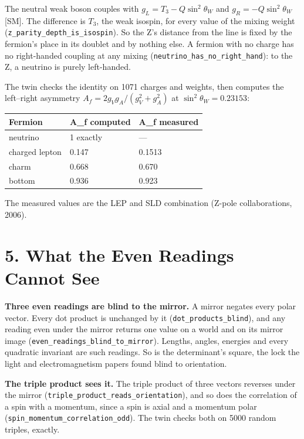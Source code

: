 \documentclass[10pt]{article}
\begin{document}
The neutral weak boson couples with \(g_L=T_3-Q\sin^2\theta_W\) and
\(g_R=-Q\sin^2\theta_W\) {[}SM{]}. The difference is \(T_3\), the weak
isospin, for every value of the mixing weight
(\texttt{z\_parity\_depth\_is\_isospin}). So the Z's distance from the
line is fixed by the fermion's place in its doublet and by nothing else.
A fermion with no charge has no right-handed coupling at any mixing
(\texttt{neutrino\_has\_no\_right\_hand}): to the Z, a neutrino is
purely left-handed.

The twin checks the identity on 1071 charges and weights, then computes
the left--right asymmetry \(A_f=2g_Vg_A/(g_V^2+g_A^2)\) at
\(\sin^2\theta_W=0.23153\):

\begin{longtable}[]{@{}lll@{}}
\toprule\noalign{}
Fermion & A\_f computed & A\_f measured \\
\midrule\noalign{}
\endhead
\bottomrule\noalign{}
\endlastfoot
neutrino & 1 exactly & --- \\
charged lepton & 0.147 & 0.1513 \\
charm & 0.668 & 0.670 \\
bottom & 0.936 & 0.923 \\
\end{longtable}

The measured values are the LEP and SLD combination (Z-pole
collaborations, 2006).

\hypertarget{what-the-even-readings-cannot-see}{%
\section{5. What the Even Readings Cannot
See}\label{what-the-even-readings-cannot-see}}

\textbf{Three even readings are blind to the mirror.} A mirror negates
every polar vector. Every dot product is unchanged by it
(\texttt{dot\_products\_blind}), and any reading even under the mirror
returns one value on a world and on its mirror image
(\texttt{even\_readings\_blind\_to\_mirror}). Lengths, angles, energies
and every quadratic invariant are such readings. So is the determinant's
square, the lock the light and electromagnetism papers found blind to
orientation.

\textbf{The triple product sees it.} The triple product of three vectors
reverses under the mirror
(\texttt{triple\_product\_reads\_orientation}), and so does the
correlation of a spin with a momentum, since a spin is axial and a
momentum polar (\texttt{spin\_momentum\_correlation\_odd}). The twin
checks both on 5000 random triples, exactly.
\end{document}
